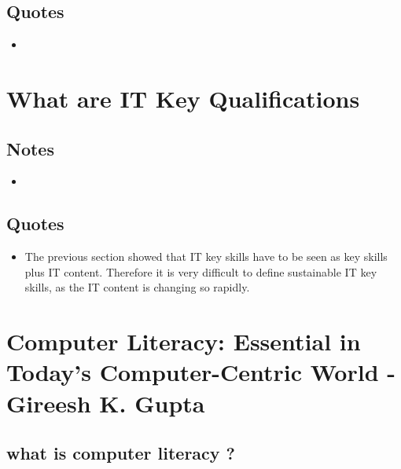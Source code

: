 \documentclass[]{article}
\begin{document}
\subsection{Quotes}

\begin{itemize}
  \item 
  
\end{itemize}

\section{What are IT Key Qualifications}

\subsection{Notes}

\begin{itemize}
  \item 
\end{itemize}

\subsection{Quotes}

\begin{itemize}
  \item The previous section showed that IT key skills have to be seen as
key skills plus IT content. Therefore it is very difficult to define
sustainable IT key skills, as the IT content is changing so rapidly.
\end{itemize}

\section{Computer Literacy: Essential in Today’s
Computer-Centric World - Gireesh K. Gupta}

\subsection{what is computer literacy ?}
\end{document}
